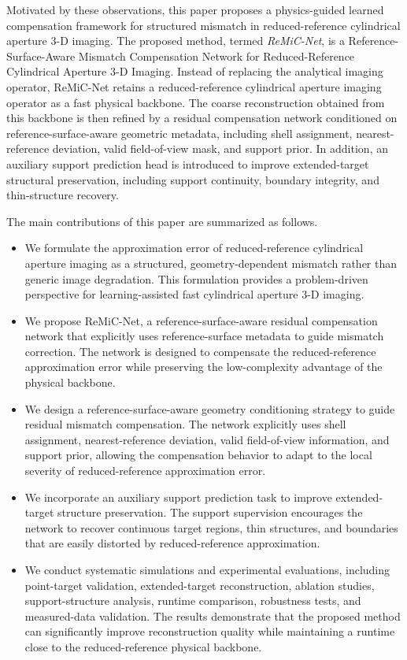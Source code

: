 \documentclass[journal]{IEEEtran}
\begin{document}
Motivated by these observations, this paper proposes a physics-guided learned compensation framework for structured mismatch in reduced-reference cylindrical aperture 3-D imaging. The proposed method, termed \emph{ReMiC-Net}, is a Reference-Surface-Aware Mismatch Compensation Network for Reduced-Reference Cylindrical Aperture 3-D Imaging. Instead of replacing the analytical imaging operator, ReMiC-Net retains a reduced-reference cylindrical aperture imaging operator as a fast physical backbone. The coarse reconstruction obtained from this backbone is then refined by a residual compensation network conditioned on reference-surface-aware geometric metadata, including shell assignment, nearest-reference deviation, valid field-of-view mask, and support prior. In addition, an auxiliary support prediction head is introduced to improve extended-target structural preservation, including support continuity, boundary integrity, and thin-structure recovery.

The main contributions of this paper are summarized as follows.

\begin{itemize}
    \item We formulate the approximation error of reduced-reference cylindrical aperture imaging as a structured, geometry-dependent mismatch rather than generic image degradation. This formulation provides a problem-driven perspective for learning-assisted fast cylindrical aperture 3-D imaging.

    \item We propose ReMiC-Net, a reference-surface-aware residual compensation network that explicitly uses reference-surface metadata to guide mismatch correction. The network is designed to compensate the reduced-reference approximation error while preserving the low-complexity advantage of the physical backbone.

    \item We design a reference-surface-aware geometry conditioning strategy to guide residual mismatch compensation. The network explicitly uses shell assignment, nearest-reference deviation, valid field-of-view information, and support prior, allowing the compensation behavior to adapt to the local severity of reduced-reference approximation error.

    \item We incorporate an auxiliary support prediction task to improve extended-target structure preservation. The support supervision encourages the network to recover continuous target regions, thin structures, and boundaries that are easily distorted by reduced-reference approximation.

    \item We conduct systematic simulations and experimental evaluations, including point-target validation, extended-target reconstruction, ablation studies, support-structure analysis, runtime comparison, robustness tests, and measured-data validation. The results demonstrate that the proposed method can significantly improve reconstruction quality while maintaining a runtime close to the reduced-reference physical backbone.
\end{itemize}
\end{document}
